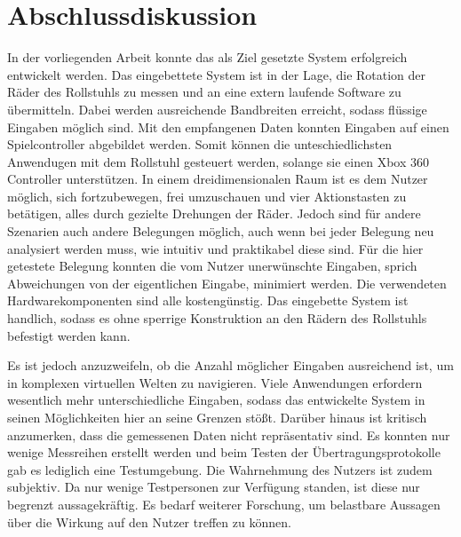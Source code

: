\chapter{Abschlussdiskussion}
In der vorliegenden Arbeit konnte das als Ziel gesetzte System erfolgreich entwickelt werden.
Das eingebettete System ist in der Lage, die Rotation der Räder des Rollstuhls zu messen und an eine extern laufende Software zu übermitteln.
Dabei werden ausreichende Bandbreiten erreicht, sodass flüssige Eingaben möglich sind.
Mit den empfangenen Daten konnten Eingaben auf einen Spielcontroller abgebildet werden.
Somit können die unteschiedlichsten Anwendugen mit dem Rollstuhl gesteuert werden, solange sie einen Xbox 360 Controller unterstützen.
In einem dreidimensionalen Raum ist es dem Nutzer möglich, sich fortzubewegen, frei umzuschauen und vier Aktionstasten zu betätigen, alles durch gezielte Drehungen der Räder.
Jedoch sind für andere Szenarien auch andere Belegungen möglich, auch wenn bei jeder Belegung neu analysiert werden muss, wie intuitiv und praktikabel diese sind.
Für die hier getestete Belegung konnten die vom Nutzer unerwünschte Eingaben, sprich Abweichungen von der eigentlichen Eingabe, minimiert werden.
Die verwendeten Hardwarekomponenten sind alle kostengünstig.
Das eingebette System ist handlich, sodass es ohne sperrige Konstruktion an den Rädern des Rollstuhls befestigt werden kann.

Es ist jedoch anzuzweifeln, ob die Anzahl möglicher Eingaben ausreichend ist, um in komplexen virtuellen Welten zu navigieren.
Viele Anwendungen erfordern wesentlich mehr unterschiedliche Eingaben, sodass das entwickelte System in seinen Möglichkeiten hier an seine Grenzen stößt.
Darüber hinaus ist kritisch anzumerken, dass die gemessenen Daten nicht repräsentativ sind.
Es konnten nur wenige Messreihen erstellt werden und beim Testen der Übertragungsprotokolle gab es lediglich eine Testumgebung.
Die Wahrnehmung des Nutzers ist zudem subjektiv.
Da nur wenige Testpersonen zur Verfügung standen, ist diese nur begrenzt aussagekräftig.
Es bedarf weiterer Forschung, um belastbare Aussagen über die Wirkung auf den Nutzer treffen zu können.

